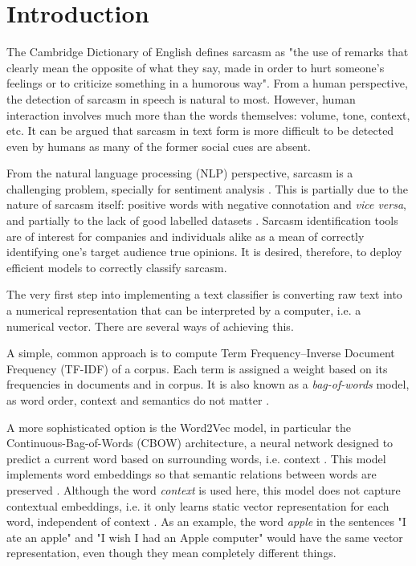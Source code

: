 \thispagestyle{plain}

\section{Introduction}

The Cambridge Dictionary of English defines sarcasm as "the use of remarks that clearly mean the opposite of what they say, made in order to hurt someone's feelings or to criticize something in a humorous way". From a human perspective, the detection of sarcasm in speech is natural to most. However, human interaction involves much more than the words themselves: volume, tone, context, etc. It can be argued that sarcasm in text form is more difficult to be detected even by humans as many of the former social cues are absent.

From the natural language processing  (NLP) perspective, sarcasm is a challenging problem, specially for sentiment analysis \citep{patro2019}. This is partially due to the nature of sarcasm itself: positive words with negative connotation and \textit{vice versa}, and partially to the lack of good labelled datasets \citep{gonzalez2011}.  Sarcasm identification tools are of interest for companies and individuals alike as a mean of correctly identifying one's target audience true opinions. It is desired, therefore, to deploy efficient models to correctly classify sarcasm.

The very first step into implementing a text classifier is converting raw text into a numerical representation that can be interpreted by a computer, i.e. a numerical vector. There are several ways of achieving this.

A simple, common approach  is to compute Term Frequency–Inverse Document Frequency (TF-IDF) of a corpus. Each term is assigned a weight based on its frequencies in documents and in corpus. It is also known as a \textit{bag-of-words} model, as word order, context and semantics do not matter \citep{manning2008introduction}.

A more sophisticated option is the Word2Vec model, in particular the Continuous-Bag-of-Words (CBOW) architecture, a neural network designed to predict a current word based on surrounding words, i.e. context \citep{mikolov2013efficient}. This model implements word embeddings so that semantic relations between words are preserved \citep{mikolov2013efficient}. Although the word \textit{context} is used here, this model does not capture contextual embeddings, i.e. it only learns static vector representation for each word, independent of context \citep{ethayarajh2020}. As an example, the word \textit{apple} in the sentences "I ate an apple" and "I wish I had an Apple computer" would have the same vector representation, even though they mean completely different things.

